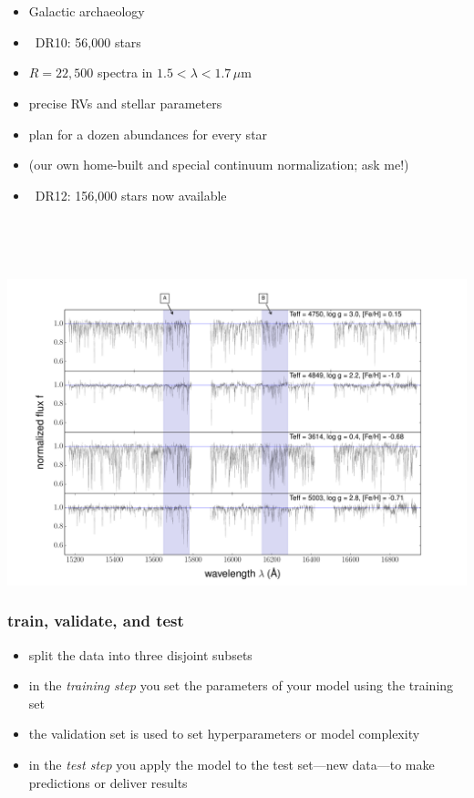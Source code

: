 \documentclass[pdftex]{beamer}
\begin{document}
\begin{frame}
  \frametitle{\sdssiii\ \apogee}
  \begin{itemize}
  \item Galactic archaeology
  \item \apogee\ DR10: 56,000 stars
  \item $R=22,500$ spectra in $1.5<\lambda<1.7\,\mu\mathrm{m}$
  \item precise RVs and stellar parameters
  \item plan for a dozen abundances for every star
  \item (our own home-built and special continuum normalization; ask me!)
  \item \apogee\ DR12: 156,000 stars now available
  \end{itemize}
\end{frame}

\begin{frame}
  \frametitle{\sdssiii\ \apogee}
  \,\hfill\includegraphics[height=\figureheight]{../documents/paper1/plots/four_examples3.pdf}
\end{frame}

\begin{frame}
  \frametitle{train, validate, and test}
  \begin{itemize}
  \item split the data into three disjoint subsets
  \item in the \emph{training step} you set the parameters of your model using the training set
  \item the validation set is used to set hyperparameters or model complexity
  \item in the \emph{test step} you apply the model to the test set---new data---to make predictions or deliver results
  \end{itemize}
\end{frame}
\end{document}
